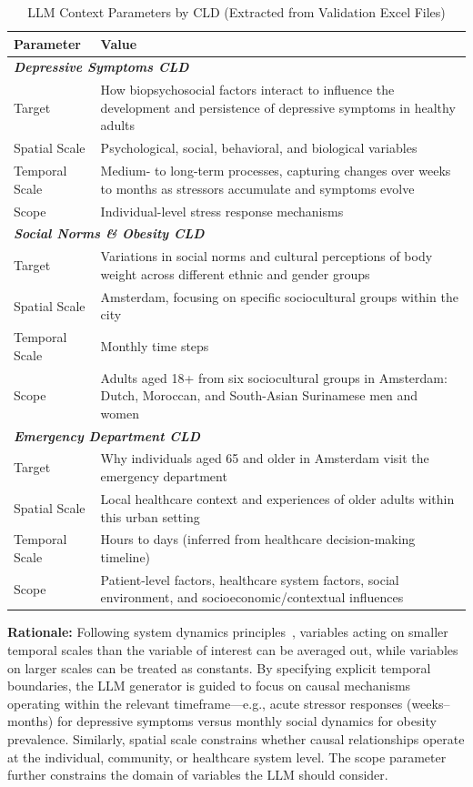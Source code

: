 \begin{table}[H]
\centering
\caption{LLM Context Parameters by CLD (Extracted from Validation Excel Files)}
\label{tab:cld_context}
\footnotesize
\begin{tabularx}{\textwidth}{@{}l X@{}}
\toprule
\textbf{Parameter} & \textbf{Value} \\
\midrule
\multicolumn{2}{l}{\textit{\textbf{Depressive Symptoms CLD}}} \\
Target & How biopsychosocial factors interact to influence the development and persistence of depressive symptoms in healthy adults \\
Spatial Scale & Psychological, social, behavioral, and biological variables \\
Temporal Scale & Medium- to long-term processes, capturing changes over weeks to months as stressors accumulate and symptoms evolve \\
Scope & Individual-level stress response mechanisms \\
\midrule
\multicolumn{2}{l}{\textit{\textbf{Social Norms \& Obesity CLD}}} \\
Target & Variations in social norms and cultural perceptions of body weight across different ethnic and gender groups \\
Spatial Scale & Amsterdam, focusing on specific sociocultural groups within the city \\
Temporal Scale & Monthly time steps \\
Scope & Adults aged 18+ from six sociocultural groups in Amsterdam: Dutch, Moroccan, and South-Asian Surinamese men and women \\
\midrule
\multicolumn{2}{l}{\textit{\textbf{Emergency Department CLD}}} \\
Target & Why individuals aged 65 and older in Amsterdam visit the emergency department \\
Spatial Scale & Local healthcare context and experiences of older adults within this urban setting \\
Temporal Scale & Hours to days (inferred from healthcare decision-making timeline) \\
Scope & Patient-level factors, healthcare system factors, social environment, and socioeconomic/contextual influences \\
\bottomrule
\end{tabularx}
\end{table}

\textbf{Rationale:} Following system dynamics principles~\cite{sterman2002system}, variables acting on smaller temporal scales than the variable of interest can be averaged out, while variables on larger scales can be treated as constants. By specifying explicit temporal boundaries, the LLM generator is guided to focus on causal mechanisms operating within the relevant timeframe---e.g., acute stressor responses (weeks--months) for depressive symptoms versus monthly social dynamics for obesity prevalence. Similarly, spatial scale constrains whether causal relationships operate at the individual, community, or healthcare system level. The scope parameter further constrains the domain of variables the LLM should consider.


